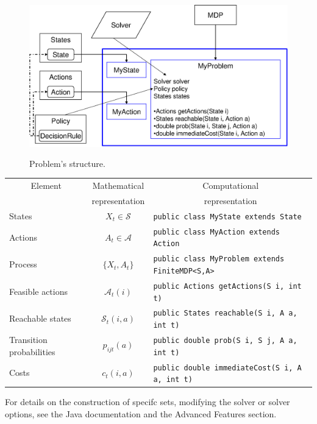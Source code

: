 \documentclass[11pt]{article}
\begin{document}
\begin{figure}[htb]  \centering
  \includegraphics[height=2.7in]{ProblemStructure}%
  \caption{Problem's structure.}
\end{figure}

\begin{center}
  \begin{tabular}{|l|c|l|}
    \hline
    \multicolumn{1}{|c|}{Element} &  \multicolumn{1}{|c|}{Mathematical} & \multicolumn{1}{|c|}{Computational}\\
    \multicolumn{1}{|c|}{} &  \multicolumn{1}{|c|}{representation} & \multicolumn{1}{|c|}{representation}\\
    \hline
    \hline
      States & $X_t \in \mathcal{S}$ & \lstinline!public class MyState extends State!\\
      \hline
      Actions & $A_t \in \mathcal{A}$ & \lstinline!public class MyAction extends Action!\\
      \hline
      Process & $\{X_t,A_t\}$ & \lstinline!public class MyProblem extends FiniteMDP<S,A>!\\
      \hline
      Feasible actions & $\mathcal{A}_t(i)$ & \lstinline!public Actions getActions(S i, int t)!\\
      \hline
      Reachable states & $\mathcal{S}_t(i,a)$ & \lstinline!public States reachable(S i, A a, int t)!\\
      \hline
      Transition probabilities & $p_{ijt}(a)$ & \lstinline!public double prob(S i, S j, A a, int t)!\\
      \hline
      Costs & $c_t(i,a)$ & \lstinline!public double immediateCost(S i, A a, int t)!\\
      \hline
  \end{tabular}
\end{center}

For details on the construction of specifc sets, modifying the solver or solver options, see the Java documentation and the Advanced Features section.
\end{document}
